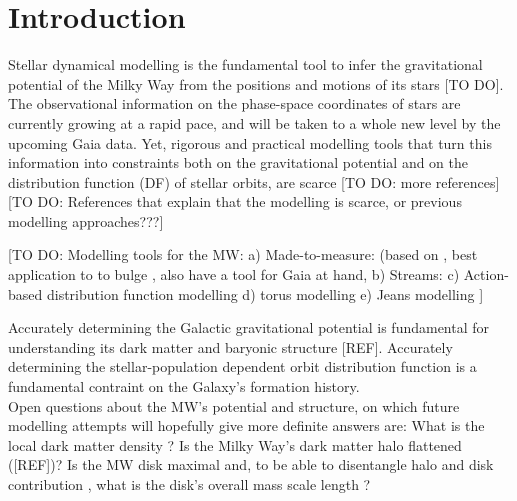 \section{Introduction} \label{sec:intro}

Stellar dynamical modelling is the fundamental tool to infer the gravitational potential of the Milky Way from the positions and motions of its stars \citep{rix13,bin11b} [TO DO]. The observational information on the phase-space coordinates of stars are currently growing at a rapid pace, and will be taken to a whole new level by the upcoming Gaia data. Yet, rigorous and practical modelling tools that turn this information into constraints both on the gravitational potential and on the distribution function (DF) of stellar orbits, are scarce \citep{rix13} [TO DO: more references] [TO DO: References that explain that the modelling is scarce, or previous modelling approaches???]

[TO DO: Modelling tools for the MW: 
a) Made-to-measure: 
\citet{lor07}(based on \citet{sye96} , best application to to bulge \citet{bis04}, 
\citet{hun14} also have a tool for Gaia at hand, 
b) Streams: 
\citet{joh99} 
c) Action-based distribution function modelling
\citet{san15}
\citet{pif4}
d) torus modelling
e) Jeans modelling
\citet{bue15}
\citet{loe12}]




Accurately determining the Galactic gravitational potential is fundamental for understanding its dark matter and baryonic structure [REF]. Accurately determining the stellar-population dependent orbit distribution function is a fundamental contraint on the Galaxy's formation history. \\

Open questions about the MW's potential and structure, on which future modelling attempts will hopefully give more definite answers are: What is the local dark matter density \citep{zha13,bt12}? Is the Milky Way's dark matter halo flattened ([REF])? Is the MW disk maximal \citep{sac97} and, to be able to disentangle halo and disk contribution \citep{deh98}, what is the disk's overall mass scale length \citep{bov13}?  \\

